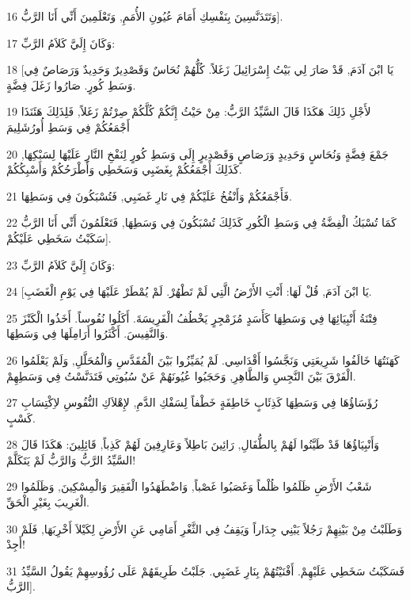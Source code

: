 \par 16 وَتَتَدَنَّسِينَ بِنَفْسِكِ أَمَامَ عُيُونِ الأُمَمِ, وَتَعْلَمِينَ أَنِّي أَنَا الرَّبُّ].
\par 17 وَكَانَ إِلَيَّ كَلاَمُ الرَّبِّ:
\par 18 [يَا ابْنَ آدَمَ, قَدْ صَارَ لِي بَيْتُ إِسْرَائِيلَ زَغَلاً. كُلُّهُمْ نُحَاسٌ وَقَصْدِيرٌ وَحَدِيدٌ وَرَصَاصٌ فِي وَسَطِ كُورٍ. صَارُوا زَغَلَ فِضَّةٍ.
\par 19 لأَجْلِ ذَلِكَ هَكَذَا قَالَ السَّيِّدُ الرَّبُّ: مِنْ حَيْثُ إِنَّكُمْ كُلَّكُمْ صِرْتُمْ زَغَلاً, فَلِذَلِكَ هَئَنَذَا أَجْمَعُكُمْ فِي وَسَطِ أُورُشَلِيمَ
\par 20 جَمْعَ فِضَّةٍ وَنُحَاسٍ وَحَدِيدٍ وَرَصَاصٍ وَقَصْدِيرٍ إِلَى وَسَطِ كُورٍ لِنَفْخِ النَّارِ عَلَيْهَا لِسَبْكِهَا, كَذَلِكَ أَجْمَعُكُمْ بِغَضَبِي وَسَخَطِي وَأَطْرَحُكُمْ وَأَسْبِكُكُمْ.
\par 21 فَأَجْمَعُكُمْ وَأَنْفُخُ عَلَيْكُمْ فِي نَارِ غَضَبِي, فَتُسْبَكُونَ فِي وَسَطِهَا.
\par 22 كَمَا تُسْبَكُ الْفِضَّةُ فِي وَسَطِ الْكُورِ كَذَلِكَ تُسْبَكُونَ فِي وَسَطِهَا, فَتَعْلَمُونَ أَنِّي أَنَا الرَّبُّ سَكَبْتُ سَخَطِي عَلَيْكُمْ].
\par 23 وَكَانَ إِلَيَّ كَلاَمُ الرَّبِّ:
\par 24 [يَا ابْنَ آدَمَ, قُلْ لَهَا: أَنْتِ الأَرْضُ الَّتِي لَمْ تَطْهُرْ. لَمْ يُمْطَرْ عَلَيْهَا فِي يَوْمِ الْغَضَبِ.
\par 25 فِتْنَةُ أَنْبِيَائِهَا فِي وَسَطِهَا كَأَسَدٍ مُزَمْجِرٍ يَخْطُفُ الْفَرِيسَةَ. أَكَلُوا نُفُوساً. أَخَذُوا الْكَنْزَ وَالنَّفِيسَ. أَكْثَرُوا أَرَامِلَهَا فِي وَسَطِهَا.
\par 26 كَهَنَتُهَا خَالَفُوا شَرِيعَتِي وَنَجَّسُوا أَقْدَاسِي. لَمْ يُمَيِّزُوا بَيْنَ الْمُقَدَّسِ وَالْمُحَلَّلِ, وَلَمْ يَعْلَمُوا الْفَرْقَ بَيْنَ النَّجِسِ وَالطَّاهِرِ, وَحَجَبُوا عُيُونَهُمْ عَنْ سُبُوتِي فَتَدَنَّسْتُ فِي وَسَطِهِمْ.
\par 27 رُؤَسَاؤُهَا فِي وَسَطِهَا كَذِئَابٍ خَاطِفَةٍ خَطْفاً لِسَفْكِ الدَّمِ, لإِهْلاَكِ النُّفُوسِ لاِكْتِسَابِ كَسْبٍ.
\par 28 وَأَنْبِيَاؤُهَا قَدْ طَيَّنُوا لَهُمْ بِالطُّفَالِ, رَائِينَ بَاطِلاً وَعَارِفِينَ لَهُمْ كَذِباً, قَائِلِينَ: هَكَذَا قَالَ السَّيِّدُ الرَّبُّ وَالرَّبُّ لَمْ يَتَكَلَّمْ!
\par 29 شَعْبُ الأَرْضِ ظَلَمُوا ظُلْماً وَغَصَبُوا غَصْباً, وَاضْطَهَدُوا الْفَقِيرَ وَالْمِسْكِينَ, وَظَلَمُوا الْغَرِيبَ بِغَيْرِ الْحَقِّ.
\par 30 وَطَلَبْتُ مِنْ بَيْنِهِمْ رَجُلاً يَبْنِي جِدَاراً وَيَقِفُ فِي الثَّغْرِ أَمَامِي عَنِ الأَرْضِ لِكَيْلاَ أَخْرِبَهَا, فَلَمْ أَجِدْ!
\par 31 فَسَكَبْتُ سَخَطِي عَلَيْهِمْ. أَفْنَيْتُهُمْ بِنَارِ غَضَبِي. جَلَبْتُ طَرِيقَهُمْ عَلَى رُؤُوسِهِمْ يَقُولُ السَّيِّدُ الرَّبُّ].

